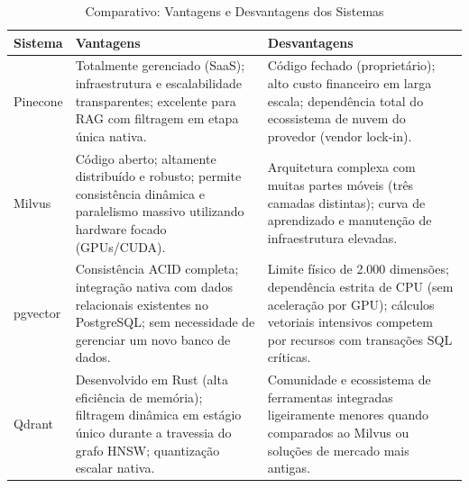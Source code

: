\documentclass[a4paper, 12pt]{article}
\begin{document}
\begin{table}[H]
\centering
\caption{Comparativo: Vantagens e Desvantagens dos Sistemas}
\begin{tabularx}{\textwidth}{l X X}
\toprule
\textbf{Sistema} & \textbf{Vantagens} & \textbf{Desvantagens} \\
\midrule
Pinecone & Totalmente gerenciado (SaaS); infraestrutura e escalabilidade transparentes; excelente para RAG com filtragem em etapa única nativa. & Código fechado (proprietário); alto custo financeiro em larga escala; dependência total do ecossistema de nuvem do provedor (vendor lock-in). \\
\midrule
Milvus & Código aberto; altamente distribuído e robusto; permite consistência dinâmica e paralelismo massivo utilizando hardware focado (GPUs/CUDA). & Arquitetura complexa com muitas partes móveis (três camadas distintas); curva de aprendizado e manutenção de infraestrutura elevadas. \\
\midrule
pgvector & Consistência ACID completa; integração nativa com dados relacionais existentes no PostgreSQL; sem necessidade de gerenciar um novo banco de dados. & Limite físico de 2.000 dimensões; dependência estrita de CPU (sem aceleração por GPU); cálculos vetoriais intensivos competem por recursos com transações SQL críticas. \\
\midrule
Qdrant & Desenvolvido em Rust (alta eficiência de memória); filtragem dinâmica em estágio único durante a travessia do grafo HNSW; quantização escalar nativa. & Comunidade e ecossistema de ferramentas integradas ligeiramente menores quando comparados ao Milvus ou soluções de mercado mais antigas. \\
\bottomrule
\end{tabularx}
\end{table}

\printbibliography
\end{document}
